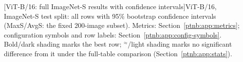 \begin{center}
    \captionsetup{hypcap=false}
    [ViT-B/16: full ImageNet-S results with confidence intervals]{ViT-B/16, ImageNet-S test split: all rows with 95\% bootstrap confidence
    intervals (MaxS/AvgS: the fixed 200-image subset). Metrics: Section~\ref{ptnb:app:metrics}; configuration symbols and row labels:
    Section~\ref{ptnb:app:config-symbols}. Bold/dark shading marks the best row; $^{\approx}$/light shading marks no significant difference from it under the full-table comparison (Section~\ref{ptnb:app:stats}).}
    \label{ptnb:tab:test-ci-vit}\label{ptnb:tab:eval-vit}\label{tab:eval-vit}
\end{center}
\captionsetup{hypcap=true}

